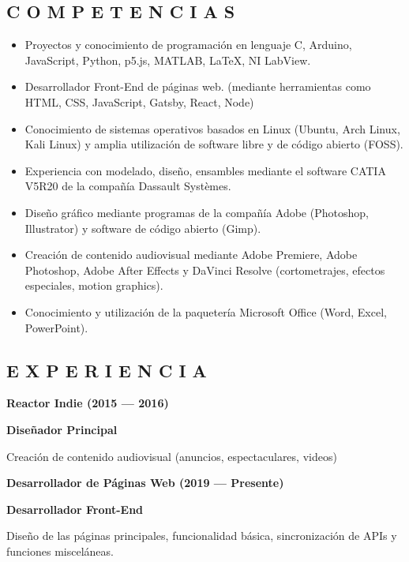 \documentclass[12pt, letterpaper]{article}
\begin{document}
\begin{shaded}
	\vspace{-0.3cm}
	\subsection*{\textcolor{title}{C O M P E T E N C I A S}}
	
	\begin{itemize}
		\item Proyectos y conocimiento de programación en lenguaje C, Arduino, JavaScript, Python, p5.js, MATLAB, LaTeX, NI LabView.
		\item Desarrollador Front-End de páginas web. (mediante herramientas como HTML, CSS, JavaScript, Gatsby, React, Node)
		\item Conocimiento de sistemas operativos basados en Linux (Ubuntu, Arch Linux, Kali Linux) y amplia utilización de software libre y  de código abierto (FOSS).
		\item Experiencia con modelado, diseño, ensambles mediante el software CATIA V5R20 de la compañía Dassault Systèmes.
		\item Diseño gráfico mediante programas de la compañía Adobe (Photoshop, Illustrator) y software de código abierto (Gimp).
		\item Creación de contenido audiovisual mediante Adobe Premiere, Adobe Photoshop, Adobe After Effects y DaVinci Resolve (cortometrajes, efectos especiales, motion graphics).
		\item Conocimiento y utilización de la paquetería Microsoft Office (Word, Excel, PowerPoint).
	\end{itemize}
\end{shaded}


\subsection*{\textcolor{title}{E X P E R I E N C I A}}

	\noindent \textbf{\textcolor{subtitle}{Reactor Indie (2015 --- 2016)}}
	
	\textbf{Diseñador Principal}

	Creación de contenido audiovisual (anuncios, espectaculares, videos)

	\noindent \textbf{\textcolor{subtitle}{Desarrollador de Páginas Web (2019 --- Presente)}}
	
	\textbf{Desarrollador Front-End}

	Diseño de las páginas principales, funcionalidad básica, sincronización de APIs y funciones misceláneas.

\renewcommand\refname{References}
\printbibliography
\end{document}
